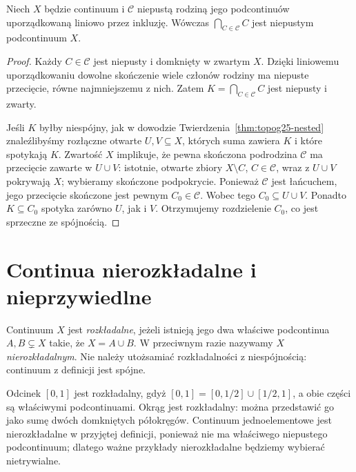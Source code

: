 \begin{lemat}
\label{lem:topog25-chain-intersection}
Niech \(X\) będzie continuum
i \(\mathcal C\) niepustą rodziną jego
podcontinuów uporządkowaną liniowo
przez inkluzję.
Wówczas \(\bigcap_{C\in\mathcal C}C\)
jest niepustym podcontinuum \(X\).
\end{lemat}
\begin{proof}
Każdy \(C\in\mathcal C\) jest
niepusty i domknięty w zwartym \(X\).
Dzięki liniowemu uporządkowaniu
dowolne skończenie wiele członów
rodziny ma niepuste przecięcie,
równe najmniejszemu z nich.
Zatem \(K=\bigcap_{C\in\mathcal C}C\)
jest niepusty i zwarty.

Jeśli \(K\) byłby niespójny,
jak w dowodzie
Twierdzenia~\ref{thm:topog25-nested}
znaleźlibyśmy rozłączne otwarte
\(U,V\subseteq X\), których suma
zawiera \(K\) i które spotykają \(K\).
Zwartość \(X\) implikuje, że pewna
skończona podrodzina \(\mathcal C\)
ma przecięcie zawarte w \(U\cup V\):
istotnie, otwarte zbiory
\(X\setminus C\), \(C\in\mathcal C\),
wraz z \(U\cup V\) pokrywają \(X\);
wybieramy skończone podpokrycie.
Ponieważ \(\mathcal C\) jest łańcuchem,
jego przecięcie skończone jest
pewnym \(C_0\in\mathcal C\).
Wobec tego \(C_0\subseteq U\cup V\).
Ponadto \(K\subseteq C_0\)
spotyka zarówno \(U\), jak i \(V\).
Otrzymujemy rozdzielenie \(C_0\),
co jest sprzeczne ze spójnością.
\end{proof}

\section{Continua nierozkładalne i nieprzywiedlne}
\label{sec:topog25-indecomposable}

\begin{definicja}[Rozkładalność]
\label{def:topog25-indecomposable}
Continuum \(X\) jest
\emph{rozkładalne}, jeżeli istnieją
jego dwa właściwe podcontinua \(A,B\subsetneq X\)
takie, że \(X=A\cup B\).
W przeciwnym razie nazywamy \(X\)
\emph{nierozkładalnym}.
Nie należy utożsamiać rozkładalności
z niespójnością: continuum z definicji
jest spójne.
\end{definicja}

\begin{przyklad}
\label{ex:topog25-decomposable}
Odcinek \([0,1]\) jest rozkładalny, gdyż
\([0,1]=[0,1/2]\cup[1/2,1]\),
a obie części są właściwymi podcontinuami.
Okrąg jest rozkładalny:
można przedstawić go jako sumę
dwóch domkniętych półokręgów.
Continuum jednoelementowe jest
nierozkładalne w przyjętej definicji,
ponieważ nie ma właściwego niepustego
podcontinuum; dlatego ważne przykłady
nierozkładalne będziemy wybierać
nietrywialne.
\end{przyklad}

